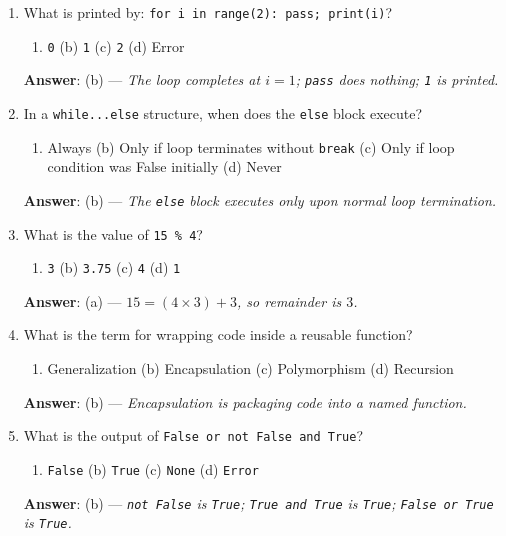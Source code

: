 \begin{enumerate}[leftmargin=1.5em]
    \item What is printed by: \texttt{for i in range(2): pass; print(i)}?
    \begin{enumerate}[label=(\alph*)]
        \item \texttt{0} \quad (b) \texttt{1} \quad (c) \texttt{2} \quad (d) Error
    \end{enumerate}
    \textbf{Answer}: (b) --- \textit{The loop completes at $i=1$; \texttt{pass} does nothing; \texttt{1} is printed.}

    \item In a \texttt{while...else} structure, when does the \texttt{else} block execute?
    \begin{enumerate}[label=(\alph*)]
        \item Always \quad (b) Only if loop terminates without \texttt{break} \quad (c) Only if loop condition was False initially \quad (d) Never
    \end{enumerate}
    \textbf{Answer}: (b) --- \textit{The \texttt{else} block executes only upon normal loop termination.}

    \item What is the value of \texttt{15 \% 4}?
    \begin{enumerate}[label=(\alph*)]
        \item \texttt{3} \quad (b) \texttt{3.75} \quad (c) \texttt{4} \quad (d) \texttt{1}
    \end{enumerate}
    \textbf{Answer}: (a) --- \textit{$15 = (4 \times 3) + 3$, so remainder is $3$.}

    \item What is the term for wrapping code inside a reusable function?
    \begin{enumerate}[label=(\alph*)]
        \item Generalization \quad (b) Encapsulation \quad (c) Polymorphism \quad (d) Recursion
    \end{enumerate}
    \textbf{Answer}: (b) --- \textit{Encapsulation is packaging code into a named function.}

    \item What is the output of \texttt{False or not False and True}?
    \begin{enumerate}[label=(\alph*)]
        \item \texttt{False} \quad (b) \texttt{True} \quad (c) \texttt{None} \quad (d) \texttt{Error}
    \end{enumerate}
    \textbf{Answer}: (b) --- \textit{\texttt{not False} is \texttt{True}; \texttt{True and True} is \texttt{True}; \texttt{False or True} is \texttt{True}.}
\end{enumerate}

